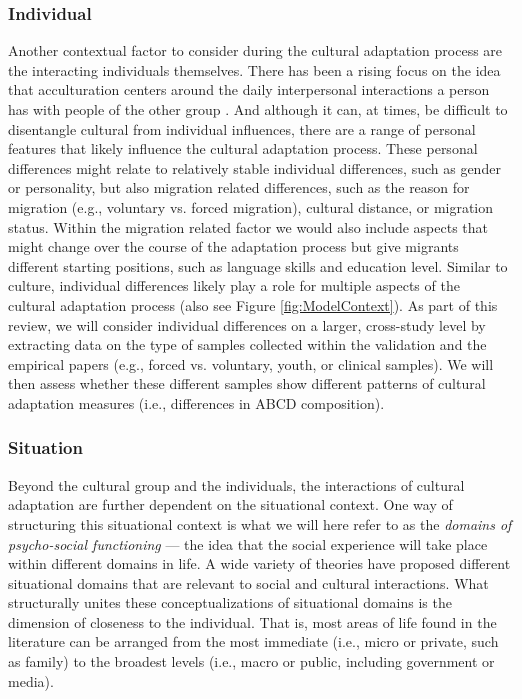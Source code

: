 \documentclass[man, 12pt, a4paper]{apa7}
\begin{document}
\subsubsection{Individual} 
Another contextual factor to consider during the cultural adaptation process are the interacting individuals themselves. There has been a rising focus on the idea that acculturation centers around the daily interpersonal interactions a person has with people of the other group \citep{Maxwell2017, Sam2010}. And although it can, at times, be difficult to disentangle cultural from individual influences, there are a range of personal features that likely influence the cultural adaptation process. These personal differences might relate to relatively stable individual differences, such as gender or personality, but also migration related differences, such as the reason for migration (e.g., voluntary vs. forced migration), cultural distance, or migration status. Within the migration related factor we would also include aspects that might change over the course of the adaptation process but give migrants different starting positions, such as language skills and education level. Similar to culture, individual differences likely play a role for multiple aspects of the cultural adaptation process (also see Figure \ref{fig:ModelContext}). As part of this review, we will consider individual differences on a larger, cross-study level by extracting data on the type of samples collected within the validation and the empirical papers (e.g., forced vs. voluntary, youth, or clinical samples). We will then assess whether these different samples show different patterns of cultural adaptation measures (i.e., differences in ABCD composition).

\subsubsection{Situation} 
Beyond the cultural group and the individuals, the interactions of cultural adaptation are further dependent on the situational context. One way of structuring this situational context is what we will here refer to as the \textit{domains of psycho-social functioning} --- the idea that the social experience will take place within different domains in life. A wide variety of theories have proposed different situational domains that are relevant to social and cultural interactions. What structurally unites these conceptualizations of situational domains is the dimension of closeness to the individual. That is, most areas of life found in the literature can be arranged from the most immediate (i.e., micro or private, such as family) to the broadest levels (i.e., macro or public, including government or media). 
\end{document}
